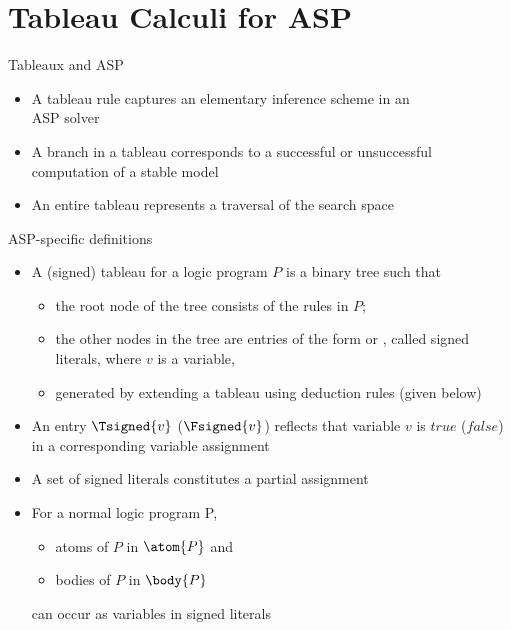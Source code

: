\section{Tableau Calculi for ASP}
\begin{frame}{Tableaux and ASP}
  \bigskip
  \begin{itemize}
  \item<1-> A tableau rule captures an elementary inference scheme in an\\ ASP solver
    \smallskip
  \item<2-> A \alert{branch} in a tableau corresponds to a successful or unsuccessful
    \alert{computation} of a stable model
    \smallskip
  \item<3-> An \alert{entire tableau} represents a traversal of the \alert{search space}
  \end{itemize}
\end{frame}
\begin{frame}{ASP-specific definitions}
  \begin{itemize}
  \item<1-> A (signed) \alert{tableau} for a logic program $P$ is a binary tree such that
    \begin{itemize}
    \item the root node of the tree consists of the rules in $P$;
    \item the other nodes in the tree are \alert{entries} of the form 
      or , called \alert{signed literals}, where $v$ is a variable,
    \item generated by extending a tableau using deduction rules (given below)
    \end{itemize}
    \smallskip
  \item<2-> An entry $\Tsigned{v}$ ($\Fsigned{v}$) reflects that variable $v$ is
    $\mathit{true}$ ($\mathit{false}$) in a corresponding variable assignment
  \item<2->[] A set of signed literals constitutes a partial assignment
    \smallskip
  \item<3-> For a normal logic program P,
    \begin{itemize}
    \item atoms of $P$ in $\atom{P}$ and
    \item bodies of $P$ in $\body{P}$ %
    \end{itemize}
    can occur as variables in signed literals
  \end{itemize}
\end{frame}
